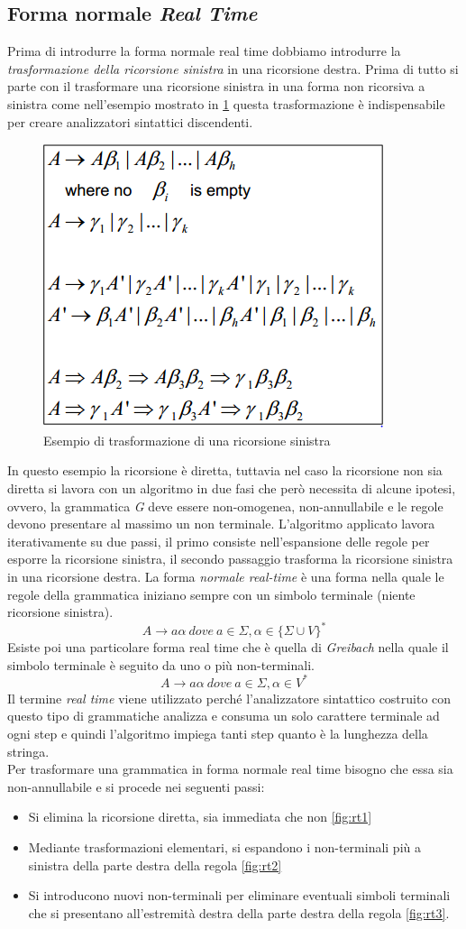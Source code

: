 \subsection{Forma normale \emph{Real Time}}
Prima di introdurre la forma normale real time dobbiamo introdurre la \emph{trasformazione della ricorsione sinistra} in una ricorsione destra. Prima di tutto si parte con il trasformare una ricorsione sinistra in una forma non ricorsiva a sinistra come nell'esempio mostrato in \figurename \ref{fig:leftrec} questa trasformazione è indispensabile per creare analizzatori sintattici discendenti.
\begin{figure}
	\centering
	\includegraphics[width=0.4\linewidth]{img/leftrec.png}
	\caption{Esempio di trasformazione di una ricorsione sinistra}\label{fig:leftrec}
\end{figure}
In questo esempio la ricorsione è diretta, tuttavia nel caso la ricorsione non sia diretta si lavora con un algoritmo in due fasi che però necessita di alcune ipotesi, ovvero, la grammatica \emph{G} deve essere non-omogenea, non-annullabile e le regole devono presentare al massimo un non terminale. L'algoritmo applicato lavora iterativamente su due passi, il primo consiste nell'espansione delle regole per esporre la ricorsione sinistra, il secondo passaggio trasforma la ricorsione sinistra in una ricorsione destra.
La forma \emph{normale real-time} è una forma nella quale le regole della grammatica iniziano sempre con un simbolo terminale (niente ricorsione sinistra). 
$$A\rightarrow a\alpha \ dove \ a \in \Sigma, \alpha\in\{\Sigma\cup V \}^*$$
Esiste poi una particolare forma real time che è quella di \emph{Greibach} nella quale il simbolo terminale è seguito da uno o più non-terminali.
$$A\rightarrow a\alpha \ dove \ a \in \Sigma, \alpha\in V^*$$
Il termine \emph{real time} viene utilizzato perché l'analizzatore sintattico costruito con questo tipo di grammatiche analizza e consuma un solo carattere terminale ad ogni step e quindi l'algoritmo impiega tanti step quanto è la lunghezza della stringa.\\
Per trasformare una grammatica in forma normale real time bisogno che essa sia non-annullabile e si procede nei seguenti passi:
\begin{itemize}
	\item Si elimina la ricorsione diretta, sia immediata che non \figurename \ref{fig:rt1}
	\item Mediante trasformazioni elementari, si espandono i non-terminali più a sinistra della parte destra della regola \figurename \ref{fig:rt2}
	\item Si introducono nuovi non-terminali per eliminare eventuali simboli terminali che si presentano all'estremità destra della parte destra della regola \figurename \ref{fig:rt3}. 
\end{itemize}

